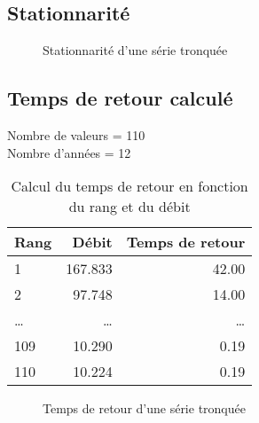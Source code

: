 \subsection{Stationnarité}
\begin{figure}[H]
    \centering
    \resizebox*{0.45\textwidth}{!}{
        
    }
    \caption{Stationnarité d'une série tronquée}
    \label{graph:stationnarite_serieTronquee}
\end{figure}

\subsection{Temps de retour calculé}
Nombre de valeurs = 110 \\
Nombre d'années = 12
\begin{multicols}{2}
    \begin{table}[H]
        \centering
        \begin{tabular}{l|r|r}
            \toprule
            \textbf{Rang} & \textbf{Débit} & \textbf{Temps de retour} \\
            \midrule
            1             & 167.833        & 42.00                    \\
            2             & 97.748         & 14.00                    \\
            \dots         & \dots          & \dots                    \\
            109           & 10.290         & 0.19                     \\
            110           & 10.224         & 0.19                     \\
            \bottomrule
        \end{tabular}
        \caption{Calcul du temps de retour en fonction du rang et du débit}
        \label{tab:serieTronquee_tempsRetour}
    \end{table}

    \columnbreak

    \begin{figure}[H]
        \centering
        \resizebox*{0.45\textwidth}{!}{
            
        }
        \caption{Temps de retour d'une série tronquée}
        \label{graph:tempsRetour_serieTronquee}
    \end{figure}
\end{multicols}

